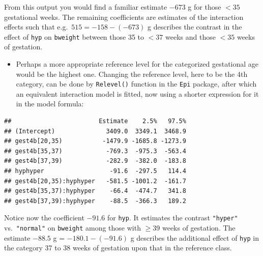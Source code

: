 \documentclass[
]{book}
\newenvironment{Shaded}{\begin{snugshade}}{\end{snugshade}}
\newcommand{\AttributeTok}[1]{\textcolor[rgb]{0.13,0.29,0.53}{#1}}
\newcommand{\DecValTok}[1]{\textcolor[rgb]{0.00,0.00,0.81}{#1}}
\newcommand{\FunctionTok}[1]{\textcolor[rgb]{0.13,0.29,0.53}{\textbf{#1}}}
\newcommand{\NormalTok}[1]{#1}
\newcommand{\OtherTok}[1]{\textcolor[rgb]{0.56,0.35,0.01}{#1}}
\newcommand{\SpecialCharTok}[1]{\textcolor[rgb]{0.81,0.36,0.00}{\textbf{#1}}}
\providecommand{\tightlist}{%
  \setlength{\itemsep}{0pt}\setlength{\parskip}{0pt}}
\begin{document}
From this output you would find a familiar estimate \(-673\) g for those \(< 35\) gestational weeks.
The remaining coefficients are estimates of the interaction effects such that e.g.~\(515 = -158 - (-673)\) g
describes the contrast in the effect of \texttt{hyp} on \texttt{bweight}
between those 35 to \(< 37\) weeks and those \(< 35\) weeks of gestation.

\begin{itemize}
\tightlist
\item
  Perhaps a more appropriate reference level for the categorized gestational age would be the highest one.
  Changing the reference level, here to be the 4th category,
  can be done by \texttt{Relevel()} function in the \texttt{Epi} package,
  after which an equivalent interaction model is fitted, now using a shorter
  expression for it in the model formula:
\end{itemize}

\begin{Shaded}
\end{Shaded}

\begin{verbatim}
##                        Estimate    2.5%   97.5%
## (Intercept)              3409.0  3349.1  3468.9
## gest4b[20,35)           -1479.9 -1685.8 -1273.9
## gest4b[35,37)            -769.3  -975.3  -563.4
## gest4b[37,39)            -282.9  -382.0  -183.8
## hyphyper                  -91.6  -297.5   114.4
## gest4b[20,35):hyphyper   -581.5 -1001.2  -161.7
## gest4b[35,37):hyphyper    -66.4  -474.7   341.8
## gest4b[37,39):hyphyper    -88.5  -366.3   189.2
\end{verbatim}

Notice now the coefficient \(-91.6\) for \texttt{hyp}.
It estimates the contrast \texttt{"hyper"} vs.~\texttt{"normal"} on
\texttt{bweight} among those with \(\geq 39\) weeks of gestation.
The estimate \(-88.5\) g = \(-180.1 -(-91.6)\) g describes the additional
effect of \texttt{hyp} in the category 37 to 38 weeks of gestation upon
that in the reference class.
\end{document}

